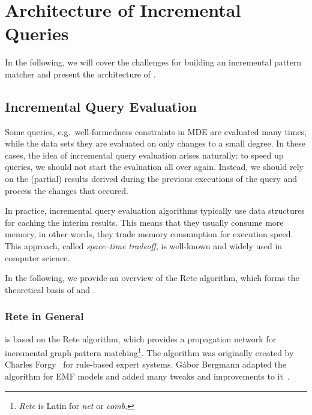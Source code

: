 \section{Architecture of Incremental Queries}
\label{sec:architecture}

In the following, we will cover the challenges for building an incremental pattern matcher and present the architecture of \iqd{}.



\subsection{Incremental Query Evaluation}
\label{rete}

Some queries, e.g.\ well-formedness constraints in MDE are evaluated many times, while the data sets they are evaluated on only changes to a small degree. In these cases, the idea of incremental query evaluation arises naturally: to speed up queries, we should not start the evaluation all over again. Instead, we should rely on the (partial) results derived during the previous executions of the query and process the changes that occured.
 
In practice, incremental query evaluation algorithms typically use data structures for caching the interim results. This  means that they usually consume more memory, in other words, they trade memory consumption for execution speed. This approach, called \emph{space--time tradeoff}, is well-known and widely used in computer science.

In the following, we provide an overview of the Rete algorithm, which forms the theoretical basis of \eiq{} and \iqd{}.

\subsubsection{Rete in General}

\iqd{} is based on the Rete algorithm, which provides a propagation network for incremental graph pattern matching\footnote{\emph{Rete} is Latin for \emph{net} or \emph{comb}.}. The algorithm was originally created by Charles Forgy~\cite{Forgy} for rule-based expert systems. Gábor Bergmann adapted the algorithm for EMF models and added many tweaks and improvements to it~\cite{BergmannRete}.


